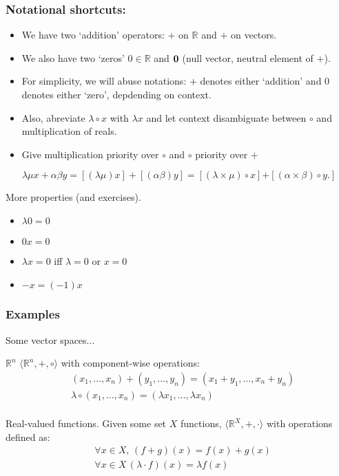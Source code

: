 \documentclass{beamer}
\begin{document}
\begin{frame}
  \frametitle{Notational shortcuts:}
  \begin{itemize}
  \item We have two `addition' operators: ${+}$ on $\mathbb{R}$ and $\textbf{+}$ on vectors.
  \item We also have two `zeros' $0 \in \mathbb{R}$ and ${\bf 0}$ (null vector, neutral element of $\textbf{+}$).
  \item For simplicity, we will abuse notations: ${+}$ denotes either `addition' and $0$ denotes either `zero', depdending on context.
  \item Also, abreviate $\lambda \circ x$ with $\lambda x$ and let context disambiguate between $\circ$ and multiplication of reals.
  \item Give multiplication priority over $\circ$ and ${\circ}$ priority over ${+}$
  \end{itemize}

  \[
  \lambda\mu x + \alpha\beta y  = [(\lambda\mu)x] + [(\alpha\beta)y] = [(\lambda \times \mu) \circ x] {\mathbin{\textbf{+}}} [(\alpha \times \beta) \circ y.]
  \]
   
\end{frame}

\begin{frame}{More properties (and exercises).}
  \begin{itemize}
  \item $\lambda 0 = 0$
  \item $0x = 0$
  \item $\lambda x = 0$ iff $\lambda = 0$ or $x = 0$
  \item $-x = (-1)x$
  \end{itemize}
\end{frame}

\begin{frame}
  \frametitle{Examples}
  Some vector spaces...
  \begin{exampleblock}{$\mathbb{R}^n$}
    $\langle \mathbb{R}^n, +, \circ \rangle$ with component-wise operations:
    \begin{align*}
      &(x_1, \dots, x_n) + (y_1, \dots, y_n) = (x_1 + y_1, \dots, x_n + y_n)\\
      &\lambda \circ (x_1, \dots, x_n) = (\lambda x_1, \dots, \lambda x_n)\\
    \end{align*}
  \end{exampleblock}

  \begin{exampleblock}{Real-valued functions.}
    Given some set $X$ functions, $\langle \mathbb{R}^{X}, +, \cdot  \rangle$ with operations defined as:
    \begin{align*}
      &\forall x \in X,\,(f + g)(x) = f(x) + g(x)\\
      &\forall x \in X\, (\lambda \cdot f)(x) = \lambda f(x)\\
    \end{align*}
  \end{exampleblock}
\end{frame}
\end{document}

